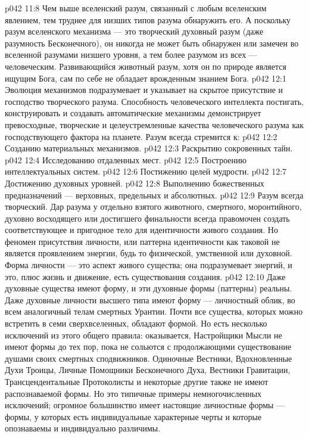 \vs p042 11:8 Чем выше вселенский разум, связанный с любым вселенским явлением, тем труднее для низших типов разума обнаружить его. А поскольку разум вселенского механизма --- это творческий духовный разум (даже разумность Бесконечного), он никогда не может быть обнаружен или замечен во вселенной разумами низшего уровня, а тем более  разумом из всех --- человеческим. Развивающийся животный разум, хотя он по природе является ищущим Бога, сам по себе не обладает врожденным знанием Бога.
\vs p042 12:1 Эволюция механизмов подразумевает и указывает на скрытое присутствие и господство творческого разума. Способность человеческого интеллекта постигать, конструировать и создавать автоматические механизмы демонстрирует превосходные, творческие и целеустремленные качества человеческого разума как господствующего фактора на планете. Разум всегда стремится к:
\vs p042 12:2 \bibnobreakspace Созданию материальных механизмов.
\vs p042 12:3 \bibnobreakspace Раскрытию сокровенных тайн.
\vs p042 12:4 \bibnobreakspace Исследованию отдаленных мест.
\vs p042 12:5 \bibnobreakspace Построению интеллектуальных систем.
\vs p042 12:6 \bibnobreakspace Постижению целей мудрости.
\vs p042 12:7 \bibnobreakspace Достижению духовных уровней.
\vs p042 12:8 \bibnobreakspace Выполнению божественных предназначений --- верховных, предельных и абсолютных.
\vs p042 12:9 \pc Разум всегда творческий. Дар разума у отдельно взятого животного, смертного, моронтийного, духовно восходящего или достигшего финальности всегда правомочен создать соответствующее и пригодное тело для идентичности живого создания. Но феномен присутствия личности, или паттерна идентичности как таковой не является проявлением энергии, будь то физической, умственной или духовной. Форма личности --- это  аспект живого существа; она подразумевает  энергий, и это, плюс жизнь и движение, есть  существования создания.
\vs p042 12:10 Даже духовные существа имеют форму, и эти духовные формы (паттерны) реальны. Даже духовные личности высшего типа имеют форму --- личностный облик, во всем аналогичный телам смертных Урантии. Почти все существа, которых можно встретить в семи сверхвселенных, обладают формой. Но есть несколько исключений из этого общего правила: оказывается, Настройщики Мысли не имеют формы до тех пор, пока не сольются с продолжающими существование душами своих смертных сподвижников. Одиночные Вестники, Вдохновленные Духи Троицы, Личные Помощники Бесконечного Духа, Вестники Гравитации, Трансцендентальные Протоколисты и некоторые другие также не имеют распознаваемой формы. Но это типичные примеры немногочисленных исключений; огромное большинство имеет настоящие личностные формы --- формы, у которых есть индивидуальные характерные черты и которые опознаваемы и индивидуально различимы.
